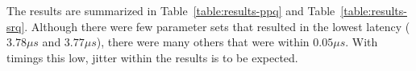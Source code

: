The results are summarized in Table~\ref{table:results-ppq} and
Table~\ref{table:results-srq}. Although there were few parameter sets that
resulted in the lowest latency ($3.78\mu s$ and $3.77\mu s$), there were many
others that were within $0.05\mu s$.  With timings this low, jitter within the
results is to be expected.

